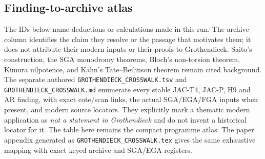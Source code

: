 \subsection*{Finding-to-archive atlas}

The IDs below name deductions or calculations made in this run.
The archive column identifies the claim they resolve or the
passage that motivates them; it does not attribute their modern
inputs or their proofs to Grothendieck. Saito's construction,
the SGA monodromy theorems, Bloch's non-torsion theorem, Kimura
nilpotence, and Kahn's Tate--Beilinson theorem remain cited
background.
The separate authored \texttt{GROTHENDIECK\_CROSSWALK.tsv} and
\texttt{GROTHENDIECK\_CROSSWALK.md} enumerate every stable
JAC-T4, JAC-P, H9 and AR finding, with exact cote/scan links,
the actual SGA/EGA/FGA inputs when present, and modern source
locators. They explicitly mark a thematic modern application as
\emph{not a statement in Grothendieck} and do not invent a historical
locator for it. The table here remains the compact programme atlas.
The paper appendix generated as
\texttt{GROTHENDIECK\_CROSSWALK.tex} gives the same exhaustive
mapping with exact keyed archive and SGA/EGA registers.

